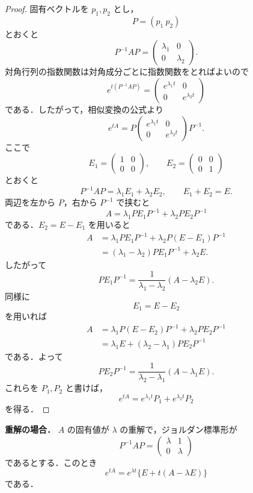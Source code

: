 \documentclass[article,paper=a4paper]{jlreq}
\begin{document}
\begin{proof}
固有ベクトルを $p_1,p_2$ とし，
\[
  P=(p_1\ p_2)
\]
とおくと
\[
  P^{-1}AP=
  \begin{pmatrix}
    \lambda_1 & 0\\
    0 & \lambda_2
  \end{pmatrix}.
\]
対角行列の指数関数は対角成分ごとに指数関数をとればよいので
\[
  e^{t(P^{-1}AP)}
  =
  \begin{pmatrix}
    e^{\lambda_1t} & 0\\
    0 & e^{\lambda_2t}
  \end{pmatrix}
\]
である．したがって，相似変換の公式より
\[
  e^{tA}
    =
    P
    \begin{pmatrix}
      e^{\lambda_1t} & 0\\
      0 & e^{\lambda_2t}
    \end{pmatrix}
    P^{-1}.
\]
ここで
\[
  E_1=
  \begin{pmatrix}
    1 & 0\\
    0 & 0
  \end{pmatrix},
  \qquad
  E_2=
  \begin{pmatrix}
    0 & 0\\
    0 & 1
  \end{pmatrix}
\]
とおくと
\[
  P^{-1}AP=\lambda_1E_1+\lambda_2E_2,
  \qquad
  E_1+E_2=E.
\]
両辺を左から $P$，右から $P^{-1}$ で挟むと
\[
  A=\lambda_1PE_1P^{-1}+\lambda_2PE_2P^{-1}
\]
である．$E_2=E-E_1$ を用いると
\begin{align*}
  A
    &=
    \lambda_1PE_1P^{-1}
    +\lambda_2P(E-E_1)P^{-1}\\
    &=
    (\lambda_1-\lambda_2)PE_1P^{-1}+\lambda_2E.
\end{align*}
したがって
\[
  PE_1P^{-1}
    =
    \frac{1}{\lambda_1-\lambda_2}(A-\lambda_2E).
\]
同様に
\[
  E_1=E-E_2
\]
を用いれば
\begin{align*}
  A
    &=
    \lambda_1P(E-E_2)P^{-1}
    +\lambda_2PE_2P^{-1}\\
    &=
    \lambda_1E+(\lambda_2-\lambda_1)PE_2P^{-1}
\end{align*}
である．よって
\[
  PE_2P^{-1}
    =
    \frac{1}{\lambda_2-\lambda_1}(A-\lambda_1E).
\]
これらを $P_1,P_2$ と書けば，
\[
  e^{tA}
    =
    e^{\lambda_1t}P_1+e^{\lambda_2t}P_2
\]
を得る．
\end{proof}

\begin{prop}
\textbf{重解の場合．}
$A$ の固有値が $\lambda$ の重解で，ジョルダン標準形が
\[
  P^{-1}AP=
  \begin{pmatrix}
    \lambda & 1\\
    0 & \lambda
  \end{pmatrix}
\]
であるとする．このとき
\[
  e^{tA}
    =
    e^{\lambda t}\{E+t(A-\lambda E)\}
\]
である．
\end{prop}
\end{document}
